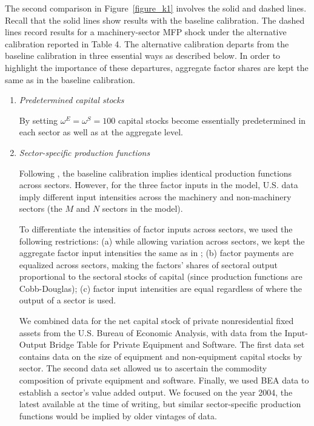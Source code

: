 \documentclass[12pt,fleqn]{article}
\begin{document}
{\normalsize \label{alternative_calibration} }

{\normalsize The second comparison in Figure~\ref{figure_k1} involves the
solid and dashed lines. Recall that the solid lines show results with the
baseline calibration. The dashed lines record results for a machinery-sector
MFP shock under the alternative calibration reported in Table 4. The
alternative calibration departs from the baseline calibration in three
essential ways as described below. In order to highlight the importance of
these departures, aggregate factor shares are kept the same as in the
baseline calibration. }

\begin{enumerate}
\item {\normalsize \emph{Predetermined capital stocks}  }

{\normalsize By setting $\omega ^{E}=\omega ^{S}=100$ capital stocks become essentially
predetermined in each sector as well as at the aggregate level. }

\item {\normalsize \emph{Sector-specific production functions}  }

{\normalsize Following , the baseline calibration
implies identical production functions across sectors. However, for the
three factor inputs in the model, U.S. data imply different input
intensities across the machinery and non-machinery sectors (the $M$ and $N$
sectors in the model).  }

\normalsize To differentiate the intensities of factor inputs across
sectors, we used the following restrictions: (a) while allowing variation
across sectors, we kept the aggregate factor input intensities the same as
in ; (b) factor payments are equalized across sectors,
making the factors' shares of sectoral output proportional to the sectoral
stocks of capital (since production functions are Cobb-Douglas); (c) factor
input intensities are equal regardless of where the output of a sector is
used.

We combined data for the net capital stock of private
nonresidential fixed assets from the U.S. Bureau of Economic Analysis, with
data from the Input-Output Bridge Table for Private Equipment and Software.
The first data set contains data on the size of equipment and non-equipment
capital stocks by sector. The second data set allowed us to ascertain the
commodity composition of private equipment and software. Finally, we used
BEA data to establish a sector's value added output. We focused on the year
2004, the latest available at the time of writing, but similar
sector-specific production functions would be implied by older vintages of
data.


\end{enumerate}
\end{document}
